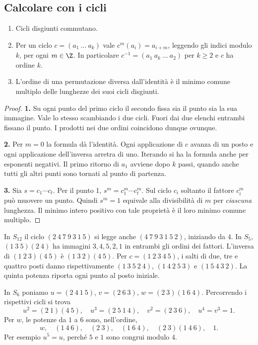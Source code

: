 \subsection{Calcolare con i cicli}
\begin{proposizione}
\begin{enumerate}
\item Cicli disgiunti commutano.
\item Per un ciclo $c=(a_1\ \ldots\ a_k)$ vale $c^m(a_i)=a_{i+m}$, leggendo gli indici modulo $k$, per ogni $m\in\Z$. In particolare $c^{-1}=(a_1\ a_k\ \ldots\ a_2)$ per $k\ge2$ e $c$ ha ordine $k$.
\item L'ordine di una permutazione diversa dall'identità è il minimo comune multiplo delle lunghezze dei suoi cicli disgiunti.
\end{enumerate}
\end{proposizione}
\begin{proof}
\textbf{1.} Su ogni punto del primo ciclo il secondo fissa sia il punto sia la sua immagine. Vale lo stesso scambiando i due cicli. Fuori dai due elenchi entrambi fissano il punto. I prodotti nei due ordini coincidono dunque ovunque.

\textbf{2.} Per $m=0$ la formula dà l'identità. Ogni applicazione di $c$ avanza di un posto e ogni applicazione dell'inversa arretra di uno. Iterando si ha la formula anche per esponenti negativi. Il primo ritorno di $a_1$ avviene dopo $k$ passi, quando anche tutti gli altri punti sono tornati al punto di partenza.

\textbf{3.} Sia $s=c_1\cdots c_t$. Per il punto 1, $s^m=c_1^m\cdots c_t^m$. Sul ciclo $c_i$ soltanto il fattore $c_i^m$ può muovere un punto. Quindi $s^m=1$ equivale alla divisibilità di $m$ per \emph{ciascuna} lunghezza. Il minimo intero positivo con tale proprietà è il loro minimo comune multiplo.
\end{proof}
\begin{esempio}
In $S_{12}$ il ciclo $(2\ 4\ 7\ 9\ 3\ 1\ 5)$ si legge anche $(4\ 7\ 9\ 3\ 1\ 5\ 2)$, iniziando da $4$. In $S_5$, $(1\ 3\ 5)(2\ 4)$ ha immagini $3,4,5,2,1$ in entrambi gli ordini dei fattori. L'inversa di $(1\ 2\ 3)(4\ 5)$ è $(1\ 3\ 2)(4\ 5)$. Per $c=(1\ 2\ 3\ 4\ 5)$, i salti di due, tre e quattro posti danno rispettivamente $(1\ 3\ 5\ 2\ 4)$, $(1\ 4\ 2\ 5\ 3)$ e $(1\ 5\ 4\ 3\ 2)$. La quinta potenza riporta ogni punto al posto iniziale.

In $S_6$ poniamo $u=(2\ 4\ 1\ 5)$, $v=(2\ 6\ 3)$, $w=(2\ 3)(1\ 6\ 4)$. Percorrendo i rispettivi cicli si trova
\[
 u^2=(2\ 1)(4\ 5),\quad u^3=(2\ 5\ 1\ 4),\quad
 v^2=(2\ 3\ 6),\quad u^4=v^3=1.
\]
Per $w$, le potenze da $1$ a $6$ sono, nell'ordine,
\[
 w,\quad (1\ 4\ 6),\quad (2\ 3),\quad (1\ 6\ 4),\quad
 (2\ 3)(1\ 4\ 6),\quad 1 .
\]
Per esempio $u^5=u$, perché $5$ e $1$ sono congrui modulo $4$.
\end{esempio}

